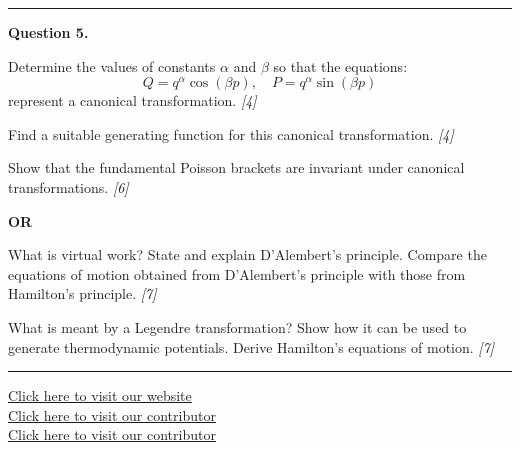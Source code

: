 \documentclass[11pt,a4paper]{article}
\newcommand{\pts}[1]{\hfill   \textit{[#1]}}
\begin{document}
\medskip\rule{\linewidth}{0.2pt}




\noindent   \textbf{Question 5.}

\begin{parts}
  \item Determine the values of constants $\alpha$ and $\beta$ so that the equations:
    \[ Q = q^{\alpha} \cos(\beta p), \quad P = q^{\alpha} \sin(\beta p) \]
    represent a canonical transformation. \pts{4}
  \item Find a suitable generating function for this canonical transformation. \pts{4}
  \item Show that the fundamental Poisson brackets are invariant under canonical transformations. \pts{6}
\end{parts}
\hfill   \textbf{OR}

\begin{parts}
  \item What is virtual work? State and explain D'Alembert's principle. Compare the equations of motion obtained from D'Alembert's principle with those from Hamilton's principle. \pts{7}
  \item What is meant by a Legendre transformation? Show how it can be used to generate thermodynamic potentials. Derive Hamilton's equations of motion. \pts{7}
\end{parts}

\vfill
\rule{\linewidth}{0.4pt}

\begin{center}\small
  \href{https://bhu-exam.vercel.app/}{Click here to visit our website}\\[4pt]
  \href{https://me-aryan.vercel.app/}{Click here to visit our contributor}\\[4pt]
  \href{https://quashan-me.vercel.app/}{Click here to visit our contributor}
\end{center}
\end{document}
